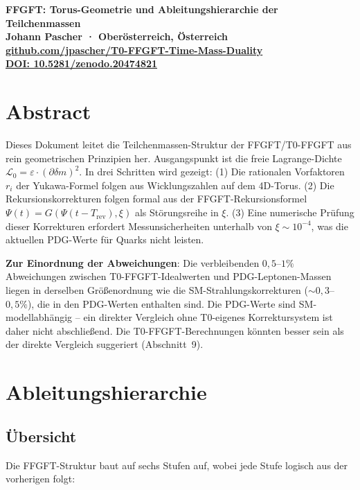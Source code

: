 {\centering
\Large\bfseries\color{T0blue}
FFGFT: Torus-Geometrie und Ableitungshierarchie der Teilchenmassen\\[0.4em]
\normalsize\color{T0gray}
Johann Pascher · Oberösterreich, Österreich\\
\href{https://github.com/jpascher/T0-FFGFT-Time-Mass-Duality}{github.com/jpascher/T0-FFGFT-Time-Mass-Duality}\\
\href{https://zenodo.org/records/20474821}{DOI: 10.5281/zenodo.20474821}\\[0.8em]
}
\thispagestyle{firstpage}

\section*{Abstract}
Dieses Dokument leitet die Teilchenmassen-Struktur der FFGFT/T0-FFGFT
aus rein geometrischen Prinzipien her. Ausgangspunkt ist die freie
Lagrange-Dichte $\mathcal{L}_0 = \varepsilon \cdot (\partial\delta m)^2$.
In drei Schritten wird gezeigt: (1) Die rationalen Vorfaktoren $r_i$ der
Yukawa-Formel folgen aus Wicklungszahlen auf dem 4D-Torus. (2) Die
Rekursionskorrekturen folgen formal aus der FFGFT-Rekursionsformel
$\Psi(t) = G(\Psi(t-T_{\mathrm{rev}}), \xi)$ als Störungsreihe in $\xi$.
(3) Eine numerische Prüfung dieser Korrekturen erfordert Messunsicherheiten
unterhalb von $\xi \sim 10^{-4}$, was die aktuellen PDG-Werte für Quarks
nicht leisten.

\textbf{Zur Einordnung der Abweichungen}: Die verbleibenden $0{,}5$--$1\%$
Abweichungen zwischen T0-FFGFT-Idealwerten und PDG-Leptonen-Massen
liegen in derselben Größenordnung wie die SM-Strahlungskorrekturen
($\sim 0{,}3$--$0{,}5\%$), die in den PDG-Werten enthalten sind.
Die PDG-Werte sind SM-modellabhängig -- ein direkter Vergleich ohne
T0-eigenes Korrektursystem ist daher nicht abschließend. Die
T0-FFGFT-Berechnungen könnten besser sein als der direkte Vergleich
suggeriert (Abschnitt~9).

\tableofcontents
\newpage

\section{Ableitungshierarchie}

\subsection{Übersicht}

Die FFGFT-Struktur baut auf sechs Stufen auf, wobei jede Stufe logisch
aus der vorherigen folgt:

